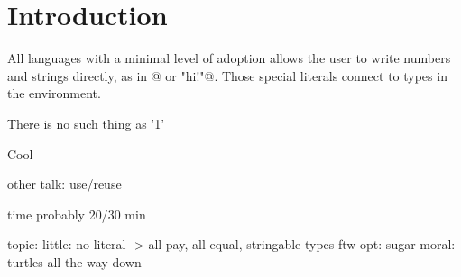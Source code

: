 \section{Introduction}





All languages with a minimal level of adoption allows
the user to write numbers and strings directly, 
as in @ or \Q@"hi!"@.
Those special literals connect to types in the environment.


There is no such thing as '1'

Cool

other talk: use/reuse

time
probably 20/30 min

topic: 
little: no literal -> all pay, all equal, stringable types ftw 
opt: sugar 
moral: turtles all the way down




\begin{acks}

\end{acks}
